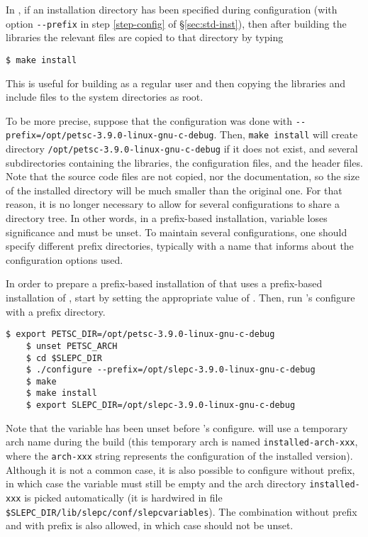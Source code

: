 In \petsc, if an installation directory has been specified during configuration (with option \Verb!--prefix! in step \ref{step-config} of \S\ref{sec:std-inst}), then after building the libraries the relevant files are copied to that directory by typing
	\begin{Verbatim}[fontsize=\small]
	$ make install
	\end{Verbatim}
	This is useful for building as a regular user and then copying the libraries and include files to the system directories as root.

To be more precise, suppose that the configuration was done with \texttt{-{}-prefix=/opt/petsc-3.9.0-linux-gnu-c-debug}. Then, \texttt{make install} will create directory \texttt{/opt/petsc-3.9.0-linux-gnu-c-debug} if it does not exist, and several subdirectories containing the libraries, the configuration files, and the header files. Note that the source code files are not copied, nor the documentation, so the size of the installed directory will be much smaller than the original one. For that reason, it is no longer necessary to allow for several configurations to share a directory tree. In other words, in a prefix-based installation, variable  loses significance and must be unset. To maintain several configurations, one should specify different prefix directories, typically with a name that informs about the configuration options used.

In order to prepare a prefix-based installation of \slepc that uses a prefix-based installation of \petsc, start by setting the appropriate value of . Then, run \slepc's configure with a prefix directory.
	\begin{Verbatim}[fontsize=\small,numbers=none]
	$ export PETSC_DIR=/opt/petsc-3.9.0-linux-gnu-c-debug
	$ unset PETSC_ARCH
	$ cd $SLEPC_DIR
	$ ./configure --prefix=/opt/slepc-3.9.0-linux-gnu-c-debug
	$ make
	$ make install
	$ export SLEPC_DIR=/opt/slepc-3.9.0-linux-gnu-c-debug
	\end{Verbatim}
Note that the variable  has been unset before \slepc's configure. \slepc will use a temporary arch name during the build (this temporary arch is named \texttt{installed-arch-xxx}, where the \texttt{arch-xxx} string represents the configuration of the installed \petsc version). Although it is not a common case, it is also possible to configure \slepc without prefix, in which case the  variable must still be empty and the arch directory \texttt{installed-xxx} is picked automatically (it is hardwired in file \texttt{\$SLEPC\_DIR/lib/slepc/conf/slepcvariables}). The combination \petsc without prefix and \slepc with prefix is also allowed, in which case  should not be unset.

